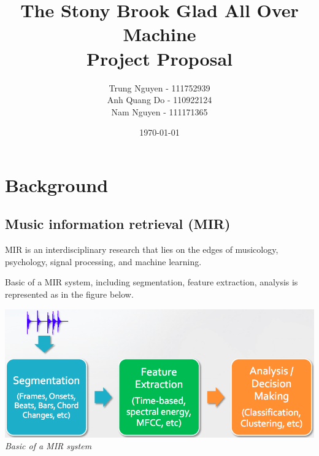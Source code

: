 \documentclass[paper=a4, fontsize=11pt, DIV=13]{scrartcl}
\begin{document}
\title{The Stony Brook Glad All Over Machine\\ Project Proposal}
\author{Trung Nguyen - 111752939
\\Anh Quang Do - 110922124
\\Nam Nguyen - 111171365}
\date{\today}
\maketitle
  
\section{Background}
\subsection{Music information retrieval (MIR)}

MIR is an interdisciplinary research that lies on the edges of musicology, psychology, signal processing, and machine learning. 
%


Basic of a MIR system, including segmentation, feature extraction, analysis is represented as in the figure below.
\begin{center}
\includegraphics[scale=0.3]{img/method.png}\\
\textit{Basic of a MIR system}\\
\end{center}
\end{document}
